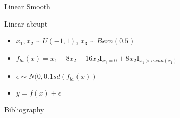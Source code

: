 \documentclass[9pt, xcolor=table]{beamer}
\begin{document}
\begin{frame}{Linear Smooth}

    
\end{frame}


\begin{frame}{Linear abrupt}
\begin{itemize}
    \item $x_1, x_2 \sim U(-1,1)$, $x_3 \sim Bern(0.5)$
    \item $ f_{la}(x) = x_{1} - 8  x_2 + 16  x_2  \mathbf{I}_{x_3 = 0} + 8  x_2  \mathbf{I}_{x_1 > mean(x_1)}$
    \item $\epsilon \sim N(0, 0.1 sd(f_{la}(x))$
    \item $y = f(x) + \epsilon$
\end{itemize}    
\end{frame}


\begin{frame}{Bibliography}
    
    

\end{frame}
\end{document}

